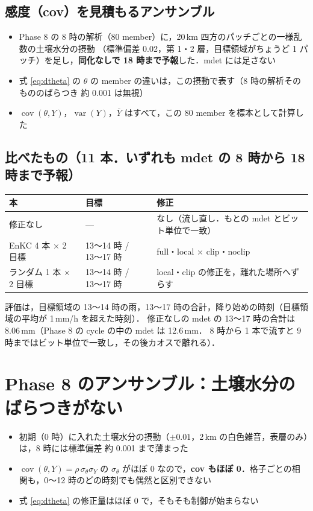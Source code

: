 \documentclass[dvipdfmx,a4paper,10.5pt]{jarticle}
\numberwithin{equation}{section}
\newcommand{\cov}{\operatorname{cov}}
\newcommand{\Var}{\operatorname{var}}
\begin{document}
\subsection{感度（cov）を見積もるアンサンブル}\label{sec:sens}
\begin{itemize}
  \item Phase 8 の 8 時の解析（80 member）に，20\,km 四方のパッチごとの一様乱数の土壌水分の摂動
        （標準偏差 0.02，第 1・2 層，目標領域がちょうど 1 パッチ）を足し，\textbf{同化なしで 18 時まで予報}した．mdet には足さない
  \item 式 \eqref{eq:dtheta} の $\theta$ の member の違いは，この摂動で表す（8 時の解析そのもののばらつき 約 0.001 は無視）
  \item $\cov(\theta,Y)$，$\Var(Y)$，$\bar Y$ はすべて，この 80 member を標本として計算した
\end{itemize}

\subsection{比べたもの（11 本．いずれも mdet の 8 時から 18 時まで予報）}
\begin{center}
\begin{tabular}{lll}\toprule
本 & 目標 & 修正 \\ \midrule
修正なし & --- & なし（流し直し．もとの mdet とビット単位で一致） \\
EnKC 4 本 $\times$ 2 目標 & 13〜14 時 / 13〜17 時 & full・local $\times$ clip・noclip \\
ランダム 1 本 $\times$ 2 目標 & 13〜14 時 / 13〜17 時 & local・clip の修正を，離れた場所へずらす \\ \bottomrule
\end{tabular}
\end{center}
評価は，目標領域の 13〜14 時の雨，13〜17 時の合計，降り始めの時刻（目標領域の平均が 1\,mm/h を超えた時刻）．
修正なしの mdet の 13〜17 時の合計は 8.06\,mm（Phase 8 の cycle の中の mdet は 12.6\,mm．
8 時から 1 本で流すと 9 時まではビット単位で一致し，その後カオスで離れる）．

\section{Phase 8 のアンサンブル：土壌水分のばらつきがない}\label{sec:1}

\begin{itemize}
  \item 初期（0 時）に入れた土壌水分の摂動（$\pm0.01$，2\,km の白色雑音，表層のみ）は，8 時には標準偏差 約 0.001 まで薄まった
  \item $\cov(\theta,Y)=\rho\,\sigma_\theta\sigma_Y$ の $\sigma_\theta$ がほぼ 0 なので，\textbf{cov もほぼ 0}．格子ごとの相関も，0〜12 時のどの時刻でも偶然と区別できない
  \item 式 \eqref{eq:dtheta} の修正量はほぼ 0 で，そもそも制御が始まらない
\end{itemize}
\end{document}
